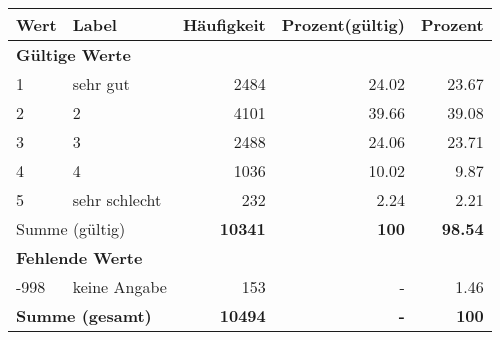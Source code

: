      \begin{longtable}{lXrrr}
     \toprule
     \textbf{Wert} & \textbf{Label} & \textbf{Häufigkeit} & \textbf{Prozent(gültig)} & \textbf{Prozent} \\
     \endhead
     \midrule
     \multicolumn{5}{l}{\textbf{Gültige Werte}}\\

     1 &
     \multicolumn{1}{X}{ sehr gut   } &


       \num{2484} &
       \num[round-mode=places,round-precision=2]{24.02} &
         \num[round-mode=places,round-precision=2]{23.67} \\

     2 &
     \multicolumn{1}{X}{ 2   } &


       \num{4101} &
       \num[round-mode=places,round-precision=2]{39.66} &
         \num[round-mode=places,round-precision=2]{39.08} \\

     3 &
     \multicolumn{1}{X}{ 3   } &


       \num{2488} &
       \num[round-mode=places,round-precision=2]{24.06} &
         \num[round-mode=places,round-precision=2]{23.71} \\

     4 &
     \multicolumn{1}{X}{ 4   } &


       \num{1036} &
       \num[round-mode=places,round-precision=2]{10.02} &
         \num[round-mode=places,round-precision=2]{9.87} \\

     5 &
     \multicolumn{1}{X}{ sehr schlecht   } &


       \num{232} &
       \num[round-mode=places,round-precision=2]{2.24} &
         \num[round-mode=places,round-precision=2]{2.21} \\
     \midrule
     \multicolumn{2}{l}{Summe (gültig)} &
       \textbf{\num{10341}} &
     \textbf{\num{100}} &
       \textbf{\num[round-mode=places,round-precision=2]{98.54}} \\
     \multicolumn{5}{l}{\textbf{Fehlende Werte}}\\
       -998 &
       keine Angabe &
         \num{153} &
        - &
         \num[round-mode=places,round-precision=2]{1.46} \\
     \midrule
     \multicolumn{2}{l}{\textbf{Summe (gesamt)}} &
          \textbf{\num{10494}} &
        \textbf{-} &
        \textbf{\num{100}} \\
     \bottomrule
     \end{longtable}
     
